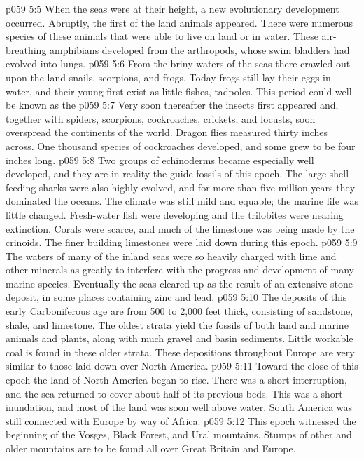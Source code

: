 \vs p059 5:5 When the seas were at their height, a new evolutionary development  occurred. Abruptly, the first of the land animals appeared. There were numerous species of these animals that were able to live on land or in water. These air\hyp{}breathing amphibians developed from the arthropods, whose swim bladders had evolved into lungs.
\vs p059 5:6 From the briny waters of the seas there crawled out upon the land snails, scorpions, and frogs. Today frogs still lay their eggs in water, and their young first exist as little fishes, tadpoles. This period could well be known as the 
\vs p059 5:7 Very soon thereafter the insects first appeared and, together with spiders, scorpions, cockroaches, crickets, and locusts, soon overspread the continents of the world. Dragon flies measured thirty inches across. One thousand species of cockroaches developed, and some grew to be four inches long.
\vs p059 5:8 Two groups of echinoderms became especially well developed, and they are in reality the guide fossils of this epoch. The large shell\hyp{}feeding sharks were also highly evolved, and for more than five million years they dominated the oceans. The climate was still mild and equable; the marine life was little changed. Fresh\hyp{}water fish were developing and the trilobites were nearing extinction. Corals were scarce, and much of the limestone was being made by the crinoids. The finer building limestones were laid down during this epoch.
\vs p059 5:9 The waters of many of the inland seas were so heavily charged with lime and other minerals as greatly to interfere with the progress and development of many marine species. Eventually the seas cleared up as the result of an extensive stone deposit, in some places containing zinc and lead.
\vs p059 5:10 The deposits of this early Carboniferous age are from 500 to 2,000 feet thick, consisting of sandstone, shale, and limestone. The oldest strata yield the fossils of both land and marine animals and plants, along with much gravel and basin sediments. Little workable coal is found in these older strata. These depositions throughout Europe are very similar to those laid down over North America.
\vs p059 5:11 Toward the close of this epoch the land of North America began to rise. There was a short interruption, and the sea returned to cover about half of its previous beds. This was a short inundation, and most of the land was soon well above water. South America was still connected with Europe by way of Africa.
\vs p059 5:12 This epoch witnessed the beginning of the Vosges, Black Forest, and Ural mountains. Stumps of other and older mountains are to be found all over Great Britain and Europe.
